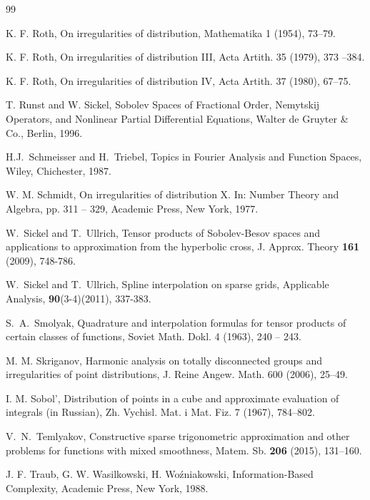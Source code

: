 \documentclass[12pt]{article}
\begin{document}
{\begin{thebibliography}{99}

K. F. Roth, {On irregularities of distribution}, Mathematika 1 (1954), 73--79.

K. F. Roth, {On irregularities of distribution III}, Acta Artith. 35 (1979), 373 --384.

K. F. Roth, {On irregularities of distribution IV}, Acta Artith. 37 (1980), 67--75.

{T. Runst and W. Sickel}, {Sobolev Spaces of Fractional Order, Nemytskij Operators,
and Nonlinear Partial Differential Equations},
Walter de Gruyter \& Co., Berlin, 1996.

H.J.~Schmeisser and H.~Triebel, Topics in Fourier Analysis and Function Spaces, Wiley,
Chichester, 1987.

W. M. Schmidt, {On irregularities of distribution X}. In: Number Theory and Algebra, pp. 311 -- 329, Academic Press, New York, 1977.

{W.~Sickel and T.~Ullrich},
Tensor products of Sobolev-Besov spaces and applications to approximation from the hyperbolic cross,
J. Approx. Theory {\bf 161} (2009), 748-786.

{W.~Sickel and T.~Ullrich},
Spline interpolation on sparse grids,
Applicable Analysis, {\bf 90}(3-4)(2011), 337-383.

S.~A.~Smolyak, Quadrature and interpolation formulas for tensor products of certain classes of functions, Soviet Math. Dokl. 4 (1963), 240 -- 243.

M. M. Skriganov, {Harmonic analysis on totally disconnected groups and irregularities of point distributions}, J. Reine Angew. Math. 600 (2006), 25--49.

 I. M. Sobol', Distribution of points in a cube and approximate evaluation of integrals (in Russian), Zh. Vychisl. Mat. i Mat. Fiz. 7 (1967), 784--802.

V.~N.~Temlyakov, Constructive sparse trigonometric approximation and other problems for functions with mixed smoothness, Matem. Sb. {\bf 206} (2015), 131--160.

J. F. Traub, G. W. Wasilkowski, H. Wo\'zniakowski, Information-Based Complexity, 
Academic Press, New York, 1988.



\end{thebibliography}}
\end{document}

